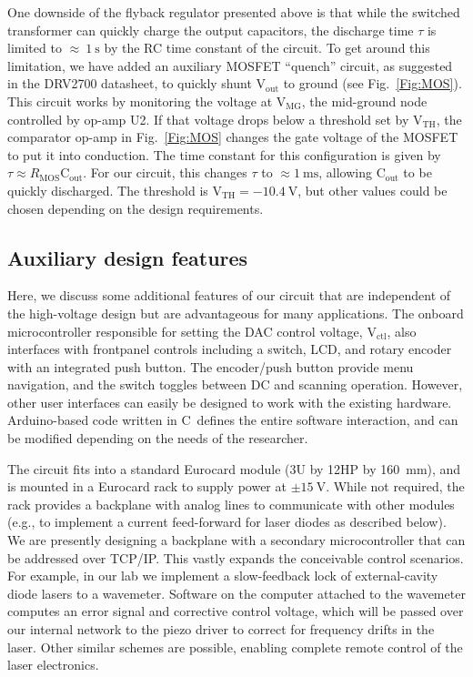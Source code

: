 \documentclass[aip,rsi,reprint]{revtex4-1} %
\newcommand{\CC}{{C\nolinebreak[4]\hspace{-.05em}\raisebox{.4ex}{\tiny\bf ++}}~}
\begin{document}
One downside of the flyback regulator presented above is that while the switched transformer can quickly charge the output capacitors, the discharge time $\tau$ is limited to {$\approx~\SI{1}{\second}$} by the RC time constant of the circuit.
To get around this limitation, we have added an auxiliary MOSFET ``quench'' circuit, as suggested in the DRV2700 datasheet, to quickly shunt $\text{V}_\text{out}$ to ground (see Fig.~\ref{Fig:MOS}).
This circuit works by monitoring the voltage at $\text{V}_\text{MG}$, the mid-ground node controlled by op-amp U2.
If that voltage drops below a threshold set by $\text{V}_\text{TH}$, the comparator op-amp in Fig.~\ref{Fig:MOS} changes the gate voltage of the MOSFET to put it into conduction.
The time constant for this configuration is given by $\tau \approx R_\text{MOS}\text{C}_\text{out}$.
For our circuit, this changes $\tau$ to $\approx\SI{1}{\milli\second}$, allowing $\text{C}_\text{out}$ to be quickly discharged.
The threshold is $\text{V}_\text{TH} = \SI{-10.4}{\volt}$, but other values could be chosen depending on the design requirements.



\subsection{Auxiliary design features}
\label{Sec:AuxDesign}

Here, we discuss some additional features of our circuit that are independent of the high-voltage design but are advantageous for many applications.
The onboard microcontroller responsible for setting the DAC control voltage, $\text{V}_\text{ctl}$, also interfaces with frontpanel controls including a switch, LCD, and rotary encoder with an integrated push button.
The encoder/push button provide menu navigation, and the switch toggles between DC and scanning operation.
However, other user interfaces can easily be designed to work with the existing hardware.
Arduino-based code\cite{Arduino} written in \CC defines the entire software interaction, and can be modified depending on the needs of the researcher.

The circuit fits into a standard Eurocard module (3U by 12HP by \SI{160}{\milli\meter}), and is mounted in a Eurocard rack to supply power at $\pm\SI{15}{\volt}$.
While not required, the rack provides a backplane with analog lines to communicate with other modules (e.g., to implement a current feed-forward for laser diodes as described below).
We are presently designing a backplane with a secondary microcontroller that can be addressed over TCP/IP.
This vastly expands the conceivable control scenarios. 
For example, in our lab we implement a slow-feedback lock of external-cavity diode lasers to a wavemeter.
Software on the computer attached to the wavemeter computes an error signal and corrective control voltage, which will be passed over our internal network to the piezo driver to correct for frequency drifts in the laser.
Other similar schemes are possible, enabling complete remote control of the laser electronics.
\end{document}
